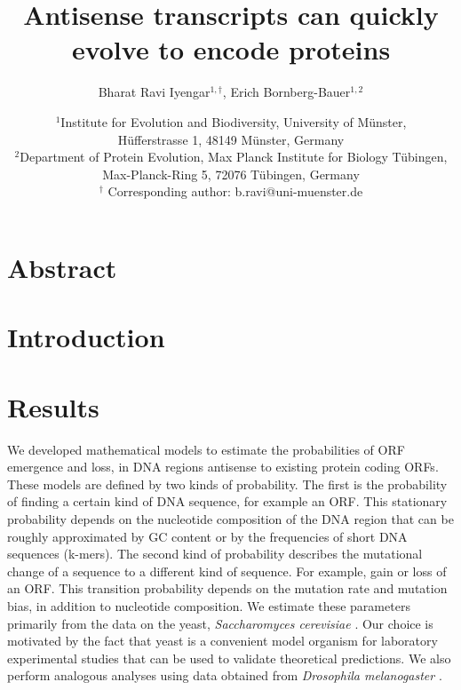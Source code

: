 \documentclass[12pt,a4paper]{article}
\title{Antisense transcripts can quickly evolve to encode proteins}
\author{Bharat Ravi Iyengar$^{1,\dagger}$, Erich Bornberg-Bauer$^{1,2}$}
\date{\small $^1$Institute for Evolution and Biodiversity, University of M\"{u}nster,\\ H\"{u}fferstrasse 1, 48149 M\"{u}nster, Germany\\[1ex] $^2$Department of Protein Evolution, Max Planck Institute for Biology T\"{u}bingen, Max-Planck-Ring 5, 72076 T\"{u}bingen, Germany \\[1ex] $^\dagger$ Corresponding author: b.ravi@uni-muenster.de}
\begin{document}
\onehalfspacing
\def\figdir{../Figures/M1_main}

\setlength{\abovedisplayskip}{0pt}
\setlength{\belowdisplayskip}{1em}

\maketitle


\linenumbers

\section*{Abstract}




\section*{Introduction}



\section*{Results}

We developed mathematical models to estimate the probabilities of ORF emergence and loss, in DNA regions antisense to existing protein coding ORFs. These models are defined by two kinds of probability. The first is the probability of finding a certain kind of DNA sequence, for example an ORF. This stationary probability depends on the nucleotide composition of the DNA region that can be roughly approximated by GC content or by the frequencies of short DNA sequences (k-mers). The second kind of probability describes the mutational change of a sequence to a different kind of sequence. For example, gain or loss of an ORF. This transition probability depends on the mutation rate and mutation bias, in addition to nucleotide composition. We estimate these parameters primarily from the data on the yeast, \textit{Saccharomyces cerevisiae} \citep{scermutrate}. Our choice is motivated by the fact that yeast is a convenient model organism for laboratory experimental studies that can be used to validate theoretical predictions. We also perform analogous analyses using data obtained from \textit{Drosophila melanogaster} \citep[][Supplementary section XX]{drosophilamutrate}.
\end{document}
